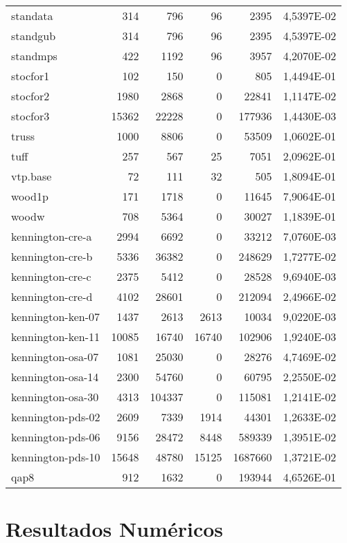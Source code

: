 {\begin{longtable}{>{\ttfamily}lrrrrc}
standata     & 314       & 796       & 96          & 2395     & \num{4,5397E-02} \\
standgub     & 314       & 796       & 96          & 2395     & \num{4,5397E-02} \\
standmps     & 422       & 1192      & 96          & 3957     & \num{4,2070E-02} \\
stocfor1     & 102       & 150       & 0           & 805      & \num{1,4494E-01} \\
stocfor2     & 1980      & 2868      & 0           & 22841    & \num{1,1147E-02} \\
stocfor3     & 15362     & 22228     & 0           & 177936   & \num{1,4430E-03} \\
truss        & 1000      & 8806      & 0           & 53509    & \num{1,0602E-01} \\
tuff         & 257       & 567       & 25          & 7051     & \num{2,0962E-01} \\
vtp.base     & 72        & 111       & 32          & 505      & \num{1,8094E-01} \\
wood1p       & 171       & 1718      & 0           & 11645    & \num{7,9064E-01} \\
woodw        & 708       & 5364      & 0           & 30027    & \num{1,1839E-01} \\
kennington-cre-a    & 2994      & 6692      & 0           & 33212    & \num{7,0760E-03} \\
kennington-cre-b    & 5336      & 36382     & 0           & 248629   & \num{1,7277E-02} \\
kennington-cre-c    & 2375      & 5412      & 0           & 28528    & \num{9,6940E-03} \\
kennington-cre-d    & 4102      & 28601     & 0           & 212094   & \num{2,4966E-02} \\
kennington-ken-07   & 1437      & 2613      & 2613        & 10034    & \num{9,0220E-03} \\
kennington-ken-11   & 10085     & 16740     & 16740       & 102906   & \num{1,9240E-03} \\
kennington-osa-07   & 1081      & 25030     & 0           & 28276    & \num{4,7469E-02} \\
kennington-osa-14   & 2300      & 54760     & 0           & 60795    & \num{2,2550E-02} \\
kennington-osa-30   & 4313      & 104337    & 0           & 115081   & \num{1,2141E-02} \\
kennington-pds-02   & 2609      & 7339      & 1914        & 44301    & \num{1,2633E-02} \\
kennington-pds-06   & 9156      & 28472     & 8448        & 589339   & \num{1,3951E-02} \\
kennington-pds-10   & 15648     & 48780     & 15125       & 1687660  & \num{1,3721E-02} \\
qap8      & 912       & 1632      & 0           & 193944   & \num{4,6526E-01} \\
\end{longtable}
}



\section{Resultados Numéricos}
